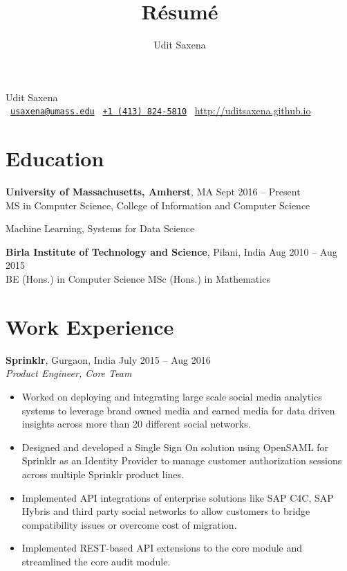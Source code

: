 \documentclass[letterpaper]{article}
\title{R\'esum\'e}
\author{Udit Saxena}
\begin{document}
\pagecolor{white}
\begin{center}
\huge
Udit Saxena\\
\small
\faEnvelope~\href{mailto:usaxena@umass.edu}{\nolinkurl{usaxena@umass.edu}}
\faPhone~\href{tel:14138245810}{\texttt{+1 (413) 824-5810}}
\faGlobe~\url{http://uditsaxena.github.io}
\normalsize
\end{center}

\section*{Education}
\vspace{-1mm}
\textbf{University of Massachusetts, Amherst}, MA \hfill Sept 2016 --
    Present\\
MS in Computer Science, College of Information and Computer Science
\vspace{-2mm}
\begin{description}[leftmargin=!, labelwidth=\widthof{Coursework },
        font=\normalfont]
    \item[Coursework:] Machine Learning,
                        Systems for Data Science
\end{description}
\vspace{-0.5mm}
\textbf{Birla Institute of Technology and Science}, Pilani, India \hfill
    Aug 2010 -- Aug 2015\\
BE (Hons.) in Computer Science
MSc (Hons.) in Mathematics

\section*{Work Experience}
\textbf{Sprinklr}, Gurgaon, India \hfill July 2015 -- Aug 2016\\
\emph{Product Engineer, Core Team}\\
\vspace{-6mm}
\begin{itemize}
\item Worked on deploying and integrating large scale social media analytics systems to leverage brand owned media and earned media for data driven insights across more than 20 different social networks.
\vspace{-2mm}
\item Designed and developed a Single Sign On solution using OpenSAML for Sprinklr as an Identity Provider to manage customer authorization sessions across multiple Sprinklr product lines.
\vspace{-2mm}
\item Implemented API integrations of enterprise solutions like SAP C4C, SAP Hybris and third party social networks to allow customers to bridge compatibility issues or overcome cost of migration. 
\vspace{-2mm}
\item Implemented REST-based API extensions to the core module and streamlined the core audit module.
\end{itemize}
\end{document}
